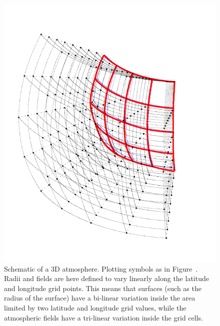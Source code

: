 \begin{figure}[!p]
 \begin{center}
  \includegraphics*[angle=-90,width=0.98\hsize]{atm_dim_3d}
  \vspace*{-15mm}
  \caption{Schematic of a 3D atmosphere. Plotting symbols as in 
    Figure~. Radii and fields are here defined to
    vary linearly along the latitude and longitude grid points. This
    means that surfaces (such as the radius of the surface) have a
    bi-linear variation inside the area limited by two latitude and
    longitude grid values, while the atmospheric fields have a
    tri-linear variation inside the grid cells. }
 \end{center}
\end{figure}

